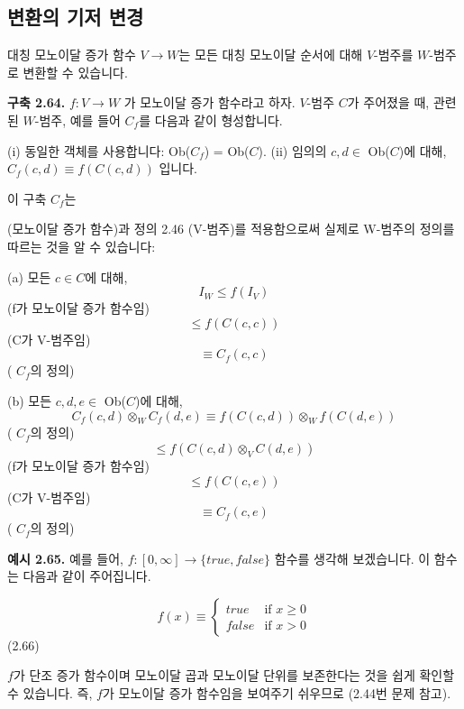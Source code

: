 \documentclass[11pt, a4paper, twoside, openany]{book}
\begin{document}
{\subsection{변환의 기저 변경}
\label{sec:2-4-1}

대칭 모노이달 증가 함수 $V \rightarrow W$는 모든 대칭 모노이달 순서에 대해  $V$-범주를 $W$-범주로 변환할 수 있습니다.

\par\medskip
\textbf{구축 2.64.} $f: V \rightarrow W$ 가 모노이달 증가 함수라고 하자. $V$-범주 $C$가 주어졌을 때, 관련된 $W$-범주, 예를 들어 $C_f$를 다음과 같이 형성합니다.

\par\medskip
(i) 동일한 객체를 사용합니다: Ob($C_f$) = Ob($C$).
(ii) 임의의 $c, d \in$ Ob($C$)에 대해,  $C_f(c, d) \equiv f(C(c, d))$ 입니다.

\par\medskip
이 구축 $C_f$는 
\begin{definitionbox}[정의 2.41]
(모노이달 증가 함수)과 정의 2.46 (V-범주)를 적용함으로써 실제로 W-범주의 정의를 따르는 것을 알 수 있습니다:
\end{definitionbox}

\par\medskip
(a) 모든 $c \in C$에 대해,
$$I_W \leq f(I_V)$$
(f\hspace{0pt}가 모노이달 증가 함수임)
$$\leq f(C(c, c))$$
(C\hspace{0pt}가 V-범주임)
$$\equiv C_f(c, c)$$
( $C_f$의 정의)

\par\medskip
(b) 모든 $c, d, e \in$ Ob($C$)에 대해, 
$$C_f(c, d) \otimes_W C_f(d, e) \equiv f(C(c, d)) \otimes_W f(C(d, e))$$
( $C_f$의 정의)
$$\leq f(C(c, d) \otimes_V C(d, e))$$
(f\hspace{0pt}가 모노이달 증가 함수임)
$$\leq f(C(c, e))$$
(C\hspace{0pt}가 V-범주임)
$$\equiv C_f(c, e)$$
( $C_f$의 정의)

\par\medskip
\textbf{예시 2.65.} 예를 들어,  $f:[0, \infty] \rightarrow \{true, false\}$ 함수를 생각해 보겠습니다. 이 함수는 다음과 같이 주어집니다.

\par\medskip
$$f(x) \equiv
\begin{cases}
true & \text{if } x \geq 0 \\
false & \text{if } x > 0
\end{cases}$$
(2.66)

\par\medskip
$f$가 단조 증가 함수이며 모노이달 곱과 모노이달 단위를 보존한다는 것을 쉽게 확인할 수 있습니다. 즉, $f$가 모노이달 증가 함수임을 보여주기 쉬우므로 (2.44\hspace{0pt}번 문제 참고).

}
\end{document}
